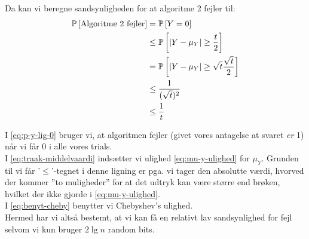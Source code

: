 Da kan vi beregne sandsynligheden for at algoritme 2 fejler til:
\begin{align}
  \P{\text{Algoritme 2 fejler}} &= \P{Y = 0} \label{eq:p-y-lig-0} \\
  &\leq \P{| Y - \mu_Y| \geq \frac{t}{2}} \label{eq:traak-middelvaardi} \\
  &= \P{|Y - \mu_Y| \geq \sqrt{t} \frac{\sqrt{t}}{2}} \nonumber \\
  &\leq \frac{1}{(\sqrt{t})^2} \label{eq:benyt-cheby}\\
  &\leq \frac{1}{t} \nonumber
\end{align}

I \cref{eq:p-y-lig-0} bruger vi, at algoritmen fejler (givet vores antagelse at svaret \emph{er} 1) når vi får 0 i alle vores trials.\\
I \cref{eq:traak-middelvaardi} indsætter vi ulighed \cref{eq:mu-y-ulighed} for $\mu_Y$. Grunden til vi får '$\leq$'-tegnet i denne ligning er pga. vi tager den absolutte værdi, hvorved der kommer ''to muligheder'' for at det udtryk kan være større end brøken, hvilket der ikke gjorde i \cref{eq:mu-y-ulighed}.\\
I \cref{eq:benyt-cheby} benytter vi Chebyshev's ulighed.\\

Hermed har vi altså bestemt, at vi kan få en relativt lav sandsynlighed for fejl selvom vi kun bruger $2 \lg n$ random bits.
